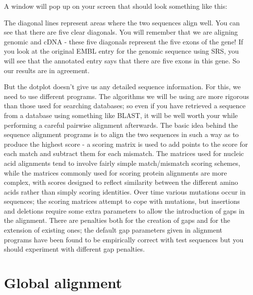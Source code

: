 \documentclass[12pt]{report}
\begin{document}
A window will pop up on	your screen that should	look something like this:

\begin{figure}[H]
\begin{center}
\end{center}
\label{fig:image-hierarchy}
\end{figure}


The diagonal lines represent areas where the two sequences align
well. You can see that there are five clear diagonals. You will
remember that we are aligning genomic and cDNA - these five diagonals
represent the five exons of the	gene! If you look at the original
EMBL entry for the genomic sequence using SRS, you will
see that the annotated entry says that there are five exons in this
gene. So our results are in agreement.

But the	dotplot	doesn't	give us	any detailed sequence information. For
this, we need to use different programs. The algorithms	we will	be
using are more rigorous	than those used	for searching databases; so
even if	you have retrieved a sequence from a database using something
like BLAST, it will be well worth your while performing	a careful
pairwise alignment afterwards. The basic idea behind the sequence
alignment programs is to align the two sequences in such a way as to
produce	the highest score - a scoring matrix is	used to	add points to
the score for each match and subtract them for each mismatch. The
matrices used for nucleic acid alignments tend to involve fairly
simple match/mismatch scoring schemes, while the matrices commonly
used for scoring protein alignments are	more complex, with scores
designed to reflect similarity between the different amino acids
rather than simply scoring identities. Over time various mutations
occur in sequences; the	scoring	matrices attempt to cope with
mutations, but insertions and deletions	require	some extra parameters
to allow the introduction of gaps in the alignment. There are
penalties both for the creation	of gaps	and for	the extension of
existing ones; the default gap parameters given	in alignment programs
have been found	to be empirically correct with test sequences but you
should experiment with different gap penalties.

\section{Global	alignment}
\end{document}
